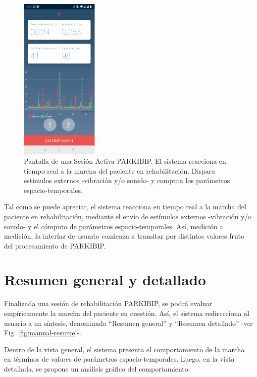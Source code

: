 \begin{figure}[H]
 \centering
 \includegraphics[height=8cm]{TESIS/imagenes/user-manual/manual-active-session.JPG}
 \caption{Pantalla de una Sesión Activa PARKIBIP. El sistema reacciona en tiempo real a la marcha del paciente en rehabilitación. Dispara estímulos externos -vibración y/o sonido- y computa los parámetros espacio-temporales.}
 \label{fig:manual-active-session}
\end{figure}

Tal como se puede apreciar, el sistema reacciona en tiempo real a la marcha del paciente en rehabilitación, mediante el envío de estímulos externos -vibración y/o sonido- y el cómputo de parámetros espacio-temporales. Así, medición a medición, la interfaz de usuario comienza a transitar por distintos valores fruto del procesamiento de PARKIBIP.

\section{Resumen general y detallado}

Finalizada una sesión de rehabilitación PARKIBIP, se podrá evaluar empíricamente la marcha del paciente en cuestión. Así, el sistema redirecciona al usuario a un síntesis, denominada ``Resumen general'' y ``Resumen detallado'' -ver Fig. \ref{fig:manual-resume}-. 

Dentro de la vista general, el sistema presenta el comportamiento de la marcha en términos de valores de parámetros espacio-temporales. Luego, en la vista detallada, se propone un análisis gráfico del comportamiento.  


